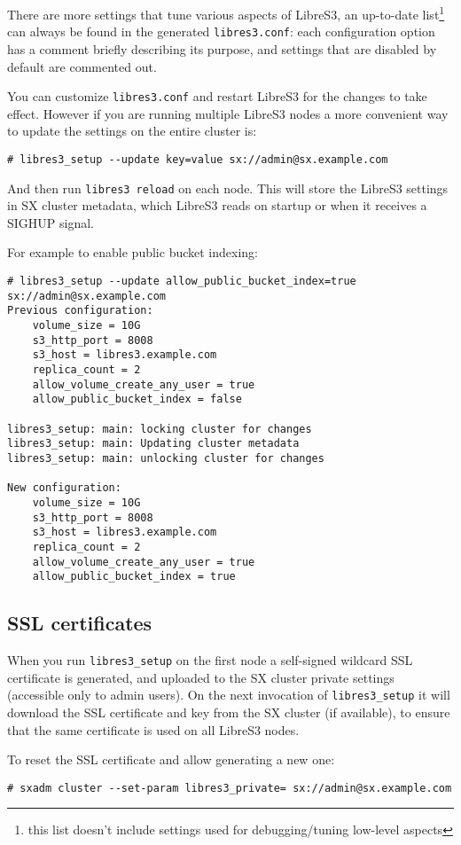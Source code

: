 There are more settings that tune various aspects of LibreS3, an up-to-date
list\footnote{this list doesn't include settings used for debugging/tuning
  low-level aspects} can always be found in the generated \verb|libres3.conf|: each configuration option has
a comment briefly describing its purpose, and settings that are disabled by
default are commented out.

You can customize \verb|libres3.conf| and restart LibreS3 for the changes to take effect.
However if you are running multiple LibreS3 nodes a more convenient way to
update the settings on the entire cluster is:
\begin{lstlisting}
# libres3_setup --update key=value sx://admin@sx.example.com
\end{lstlisting}
And then run \verb|libres3 reload| on each node.
This will store the LibreS3 settings in SX cluster metadata, which LibreS3 reads
on startup or when it receives a SIGHUP signal.

For example to enable public bucket indexing:
\begin{lstlisting}
# libres3_setup --update allow_public_bucket_index=true sx://admin@sx.example.com
Previous configuration:
	volume_size = 10G
	s3_http_port = 8008
	s3_host = libres3.example.com
	replica_count = 2
	allow_volume_create_any_user = true
	allow_public_bucket_index = false

libres3_setup: main: locking cluster for changes
libres3_setup: main: Updating cluster metadata
libres3_setup: main: unlocking cluster for changes

New configuration:
	volume_size = 10G
	s3_http_port = 8008
	s3_host = libres3.example.com
	replica_count = 2
	allow_volume_create_any_user = true
	allow_public_bucket_index = true
\end{lstlisting}

\subsection{SSL certificates}

When you run \verb|libres3_setup| on the first node a self-signed wildcard SSL certificate is
generated, and uploaded to the SX cluster private settings (accessible only to
admin users).
On the next invocation of \verb|libres3_setup| it will download the SSL
certificate and key from the SX cluster (if available), to ensure that the same
certificate is used on all LibreS3 nodes.

To reset the SSL certificate and allow generating a new one:
\begin{lstlisting}
# sxadm cluster --set-param libres3_private= sx://admin@sx.example.com
\end{lstlisting}

